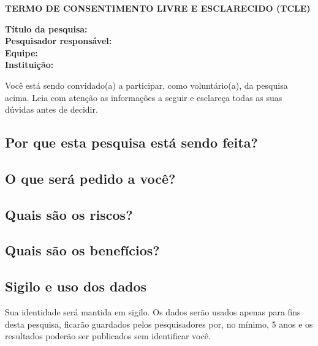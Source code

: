 \begin{center}
  \textbf{\large TERMO DE CONSENTIMENTO LIVRE E ESCLARECIDO (TCLE)}
\end{center}

\noindent\textbf{Título da pesquisa:} \titulo\\
\textbf{Pesquisador responsável:} \orientador\\
\textbf{Equipe:} \begingroup\def\\{, }\alunos\endgroup\unskip\\
\textbf{Instituição:} \eticaInstituicao

\bigskip
Você está sendo convidado(a) a participar, como voluntário(a), da pesquisa acima. Leia com atenção as informações a seguir e esclareça todas as suas dúvidas antes de decidir.

\subsection*{Por que esta pesquisa está sendo feita?}

\subsection*{O que será pedido a você?}

\subsection*{Quais são os riscos?}

\subsection*{Quais são os benefícios?}

\subsection*{Sigilo e uso dos dados}
Sua identidade será mantida em sigilo. Os dados serão usados apenas para fins desta pesquisa, ficarão guardados pelos pesquisadores por, no mínimo, 5 anos e os resultados poderão ser publicados sem identificar você.

